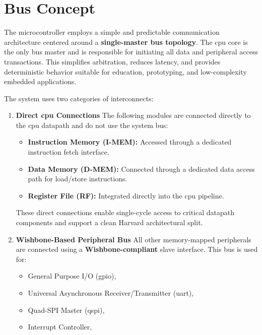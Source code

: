 \section{Bus Concept}
The microcontroller employs a simple and predictable communication architecture
centered around a \textbf{single-master bus topology}. The \gls{cpu} core is
the only bus master and is responsible for initiating all data and peripheral
access transactions. This simplifies arbitration, reduces latency, and provides
deterministic behavior suitable for education, prototyping, and low-complexity
embedded applications.

The system uses two categories of interconnects:

\begin{enumerate}
      \item \textbf{Direct \gls{cpu} Connections}
            The following modules are connected directly to the \gls{cpu} datapath and do not use the system bus:
            \begin{itemize}
                  \item \textbf{Instruction Memory (\gls{I-MEM}):} Accessed through a dedicated instruction fetch interface.
                  \item \textbf{Data Memory (\gls{D-MEM}):} Connected through a dedicated data access path for load/store instructions.
                  \item \textbf{Register File (RF):} Integrated directly into the \gls{cpu} \gls{pipeline}.
            \end{itemize}

            These direct connections enable single-cycle access to critical datapath
            components and support a clean \gls{Harvard} architectural split.

      \item \textbf{Wishbone-Based Peripheral Bus}
            All other memory-mapped peripherals are connected using a \textbf{Wishbone-compliant} slave interface.
            This bus is used for:
            \begin{itemize}
                  \item General Purpose I/O (\gls{gpio}),
                  \item Universal Asynchronous Receiver/Transmitter (\gls{uart}),
                  \item Quad-SPI Master (\gls{qspi}),
                  \item Interrupt Controller,
            \end{itemize}


\end{enumerate}
